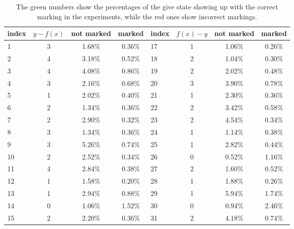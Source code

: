 \documentclass[reqno, 10pt]{amsart}
\numberwithin{equation}{section}                %
\begin{document}
\begin{table}[ht]
   \begin{tabular}{|l|c|c|c||l|c|c|c|}
      \hline
      index & $y - f (x)$ & not marked & marked & index & $f (x) - y$ & not marked & marked \\
      \hline
      1 & 3 & {\color{ForestGreen} 1.68\%} & {\color{Red} 0.36\%} & 17 & 1 & {\color{ForestGreen} 1.06\%} & {\color{Red} 0.26\%} \\
      2 & 4 & {\color{ForestGreen} 3.18\%} & {\color{Red} 0.52\%} & 18 & 2 & {\color{ForestGreen} 1.04\%} & {\color{Red} 0.30\%} \\
      3 & 4 & {\color{ForestGreen} 4.08\%} & {\color{Red} 0.86\%} & 19 & 2 & {\color{ForestGreen} 2.02\%} & {\color{Red} 0.48\%} \\
      4 & 3 & {\color{ForestGreen} 2.16\%} & {\color{Red} 0.68\%} & 20 & 3 & {\color{ForestGreen} 3.90\%} & {\color{Red} 0.78\%} \\
      5 & 1 & {\color{ForestGreen} 2.02\%} & {\color{Red} 0.40\%} & 21 & 1 & {\color{ForestGreen} 2.30\%} & {\color{Red} 0.36\%} \\
      6 & 2 & {\color{ForestGreen} 1.34\%} & {\color{Red} 0.36\%} & 22 & 2 & {\color{ForestGreen} 3.42\%} & {\color{Red} 0.58\%} \\
      7 & 2 & {\color{ForestGreen} 2.90\%} & {\color{Red} 0.32\%} & 23 & 2 & {\color{ForestGreen} 4.54\%} & {\color{Red} 0.34\%} \\
      8 & 3 & {\color{ForestGreen} 1.34\%} & {\color{Red} 0.36\%} & 24 & 1 & {\color{ForestGreen} 1.14\%} & {\color{Red} 0.38\%} \\
      9 & 3 & {\color{ForestGreen} 5.26\%} & {\color{Red} 0.74\%} & 25 & 1 & {\color{ForestGreen} 2.82\%} & {\color{Red} 0.44\%} \\
      10 & 2 & {\color{ForestGreen} 2.52\%} & {\color{Red} 0.34\%} & 26 & 0 & {\color{Red} 0.52\%} & {\color{ForestGreen} 1.16\%} \\
      11 & 4 & {\color{ForestGreen} 2.84\%} & {\color{Red} 0.38\%} & 27 & 2 & {\color{ForestGreen} 1.60\%} & {\color{Red} 0.52\%} \\
      12 & 1 & {\color{ForestGreen} 1.58\%} & {\color{Red} 0.20\%} & 28 & 1 & {\color{ForestGreen} 1.88\%} & {\color{Red} 0.26\%} \\
      13 & 1 & {\color{ForestGreen} 2.94\%} & {\color{Red} 0.88\%} & 29 & 1 & {\color{ForestGreen} 5.94\%} & {\color{Red} 1.74\%} \\
      14 & 0 & {\color{Red} 1.06\%} & {\color{ForestGreen} 1.52\%} & 30 & 0 & {\color{Red} 0.94\%} & {\color{ForestGreen} 2.46\%} \\
      15 & 2 & {\color{ForestGreen} 2.20\%} & {\color{Red} 0.36\%} & 31 & 2 & {\color{ForestGreen} 4.18\%} & {\color{Red} 0.74\%} \\
      \hline
   \end{tabular}
   \caption{The {\color{ForestGreen} green} numbers show the percentages of the give state showing up with the correct marking in the experiments, while the {\color{Red} red} ones show incorrect markings.}
   \label{table:oracle}
\end{table}
\end{document}
